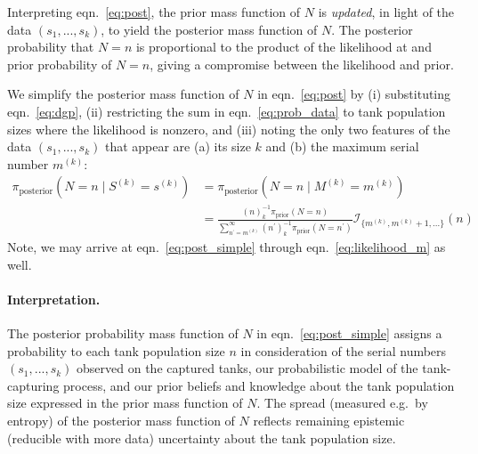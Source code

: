 \documentclass[11pt, oneside]{article}
\newcommand{\data}{$(s_1, ..., s_k)$\xspace}
\begin{document}
Interpreting eqn.~\ref{eq:post}, the prior mass function of $N$ is \emph{updated}, in light of the data \data, to yield the posterior mass function of $N$. The posterior probability that $N=n$ is proportional to the product of the likelihood at and prior probability of $N=n$, giving a compromise between the likelihood and prior.

We simplify the posterior mass function of $N$ in eqn.~\ref{eq:post} by (i) substituting eqn.~\ref{eq:dgp}, (ii) restricting the sum in eqn.~\ref{eq:prob_data} to tank population sizes where the likelihood is nonzero, and (iii) noting the only two features of the data \data that appear are (a) its size $k$ and (b) the maximum serial number $m^{(k)}$:
\begin{align}
	\pi_{\text{posterior}}(N=n \mid S^{(k)}=s^{(k)}) &= 
	\pi_{\text{posterior}}(N=n \mid M^{(k)}=m^{(k)})  \nonumber \\
	& = 
	\frac{
		\displaystyle (n)_k^{-1} \pi_{\text{prior}}(N=n)
	}{
		\displaystyle \sum_{n^\prime=m^{(k)}}^\infty (n^\prime)_{k}^{-1}  \pi_{\text{prior}}(N=n^\prime)
	}
	\mathcal{I}_{\{m^{(k)}, m^{(k)}+1,...\}}(n)
	\label{eq:post_simple}
\end{align}
Note, we may arrive at eqn.~\ref{eq:post_simple} through eqn.~\ref{eq:likelihood_m} as well.

\paragraph{Interpretation.}
The posterior probability mass function of $N$ in eqn.~\ref{eq:post_simple} assigns a probability to each tank population size $n$ in consideration of the serial numbers \data observed on the captured tanks, our probabilistic model of the tank-capturing process, and our prior beliefs and knowledge about the tank population size expressed in the prior mass function of $N$. The spread (measured e.g.\ by entropy) of the posterior mass function of $N$ reflects remaining epistemic (reducible with more data) \cite{fox2011distinguishing,senge2014reliable} uncertainty about the tank population size.
\end{document}
